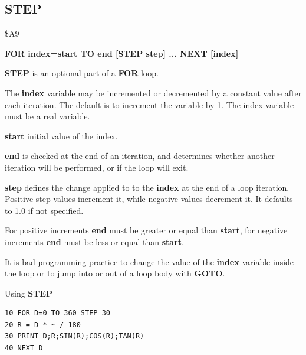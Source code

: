 
\newpage
\subsection{STEP}
\begin{description}[leftmargin=2cm,style=nextline]
\item [Token:] \$A9
\item [Format:] {\bf FOR index=start TO end [STEP step] ... NEXT [index]}
\item [Usage:] {\bf STEP} is an optional part of a
               {\bf FOR} loop.

               The {\bf index} variable may be incremented or decremented
               by a constant value after each iteration. The default
               is to increment the variable by 1.
               The index variable must be a real variable.

               {\bf start} initial value of the index.

               {\bf end} is checked at the end of an iteration,
               and determines whether another iteration will be performed,
               or if the loop will exit.

               {\bf step} defines the change applied to
               to the {\bf index} at the end of a loop iteration.
               Positive step values increment it, while negative values
               decrement it. It defaults to 1.0 if not specified.

\item [Remarks:] For positive increments {\bf end} must be greater
               or equal than {\bf start}, for negative increments
               {\bf end} must be less or equal than {\bf start}.

               It is bad programming practice to change the value
               of the {\bf index} variable inside the loop or to
               jump into or out of a loop body with {\bf GOTO}.

\item [Example:] Using {\bf STEP}
\begin{tcolorbox}[colback=black,coltext=white]
\verbatimfont{\codefont}
\begin{verbatim}
10 FOR D=0 TO 360 STEP 30
20 R = D * ~ / 180
30 PRINT D;R;SIN(R);COS(R);TAN(R)
40 NEXT D
\end{verbatim}
\end{tcolorbox}
\end{description}

